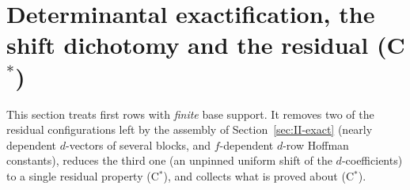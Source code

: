 \documentclass[10pt]{amsart}
\theoremstyle{definition}
\theoremstyle{remark}
\begin{document}

\section{Determinantal exactification, the shift dichotomy and the residual (C$^*$)}\label{sec:II-Cstar}

This section treats first rows with \emph{finite} base support.  It
removes two of the residual configurations left by the assembly of
Section~\ref{sec:II-exact} (nearly dependent $d$-vectors of several
blocks, and $f$-dependent $d$-row Hoffman constants), reduces the third
one (an unpinned uniform shift of the $d$-coefficients) to a single
residual property (C$^*$), and collects what is proved about (C$^*$).
\end{document}
